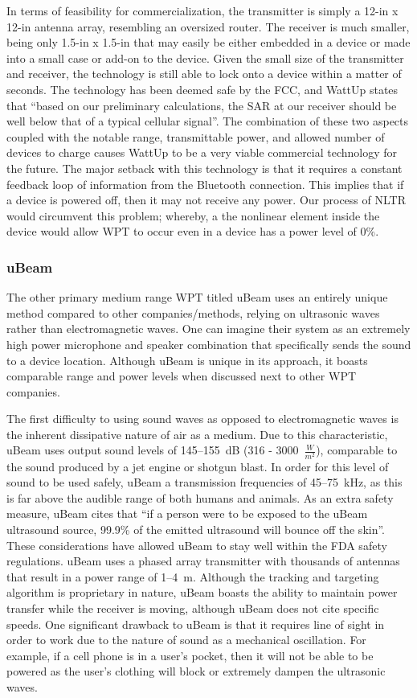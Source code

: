 In terms of feasibility for commercialization, the transmitter is simply a 12-in x 12-in antenna array, resembling an oversized router. The receiver is much smaller, being only 1.5-in x 1.5-in that may easily be either embedded in a device or made into a small case or add-on to the device. Given the small size of the transmitter and receiver, the technology is still able to lock onto a device within a matter of seconds. The technology has been deemed safe by the FCC, and WattUp states that ``based on our preliminary calculations, the SAR at our receiver should be well below that of a typical cellular signal''. The combination of these two aspects coupled with the notable range, transmittable power, and allowed number of devices to charge causes WattUp to be a very viable commercial technology for the future. The major setback with this technology is that it requires a constant feedback loop of information from the Bluetooth connection. This implies that if a device is powered off, then it may not receive any power. Our process of NLTR would circumvent this problem; whereby, a the nonlinear element inside the device would allow WPT to occur even in a device has a power level of 0\%.

\subsubsection{uBeam}
The other primary medium range WPT titled uBeam uses an entirely unique method compared to other companies/methods, relying on ultrasonic waves rather than electromagnetic waves. One can imagine their system as an extremely high power microphone and speaker combination that specifically sends the sound to a device location. Although uBeam is unique in its approach, it boasts comparable range and power levels when discussed next to other WPT companies.

The first difficulty to using sound waves as opposed  to electromagnetic waves is the inherent dissipative nature of air as a medium. Due to this characteristic, uBeam uses output sound levels of \numrange{145}{155}~dB (316 - 3000~$\frac{W}{m^2}$), comparable to the sound produced by a jet engine or shotgun blast. In order for this level of sound to be used safely, uBeam a transmission frequencies of \numrange{45}{75}~kHz, as this is far above the audible range of both humans and animals. As an extra safety measure, uBeam cites that ``if a person were to be exposed to the uBeam ultrasound source, 99.9\% of the emitted ultrasound will bounce off the skin''. These considerations have allowed uBeam to stay well within the FDA safety regulations.
uBeam uses a phased array transmitter with thousands of antennas that result in a power range of \numrange{1}{4}~m. Although the tracking and targeting algorithm is proprietary in nature, uBeam boasts the ability to maintain power transfer while the receiver is moving, although uBeam does not cite specific speeds. One significant drawback to uBeam is that it requires line of sight in order to work due to the nature of sound as a mechanical oscillation. For example, if a cell phone is in a user’s pocket, then it will not be able to be powered as the user’s clothing will block or extremely dampen the ultrasonic waves.

